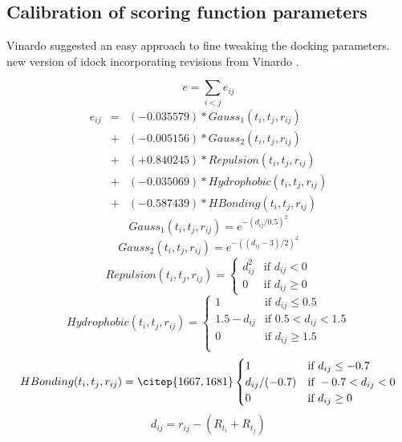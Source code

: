 \documentclass[a4paper,12pt]{article}
\begin{document}
\subsection*{Calibration of scoring function parameters}

Vinardo \citep{1741} suggested an easy approach to fine tweaking the docking parameters. new version of idock incorporating revisions from Vinardo \citep{1741}.

\begin{equation}
\label{eqn:e}
e = \sum_{i < j} e_{ij}
\end{equation}
\begin{eqnarray}
\label{eqn:eij}
e_{ij} &=& (-0.035579) * Gauss_1(t_i, t_j, r_{ij}) \nonumber \\
       &+& (-0.005156) * Gauss_2(t_i, t_j, r_{ij}) \nonumber \\
       &+& (+0.840245) * Repulsion(t_i, t_j, r_{ij}) \nonumber \\
       &+& (-0.035069) * Hydrophobic(t_i, t_j, r_{ij}) \nonumber \\
       &+& (-0.587439) * HBonding(t_i, t_j, r_{ij})
\end{eqnarray}
\begin{equation}
\label{eqn:Gauss1}
Gauss_1(t_i, t_j, r_{ij}) = e^{-(d_{ij} / 0.5)^2}
\end{equation}
\begin{equation}
\label{eqn:Gauss2}
Gauss_2(t_i, t_j, r_{ij}) = e^{-((d_{ij} - 3) / 2)^2}
\end{equation}
\begin{equation}
\label{eqn:Repulsion}
Repulsion(t_i, t_j, r_{ij}) =
\begin{cases}
d_{ij}^2 & \text{if } d_{ij} < 0\\
0 &\text{if } d_{ij} \geq 0
\end{cases}
\end{equation}
\begin{equation}
\label{eqn:Hydrophobic}
Hydrophobic(t_i, t_j, r_{ij}) =
\begin{cases}
1 & \text{if } d_{ij} \leq 0.5\\
1.5 - d_{ij} & \text{if } 0.5 < d_{ij} < 1.5\\
0 & \text{if } d_{ij} \geq 1.5\\
\end{cases}
\end{equation}
\begin{equation}
\label{eqn:HBonding}
HBonding(t_i, t_j, r_{ij}) =\citep{1667,1681}
\begin{cases}
1 & \text{if } d_{ij} \leq -0.7\\
d_{ij} / (-0.7) & \text{if } -0.7 < d_{ij} < 0\\
0 & \text{if } d_{ij} \geq 0\\
\end{cases}
\end{equation}
\begin{equation}
\label{eqn:dij}
d_{ij} = r_{ij} - (R_{t_i} + R_{t_j})
\end{equation}
\end{document}
